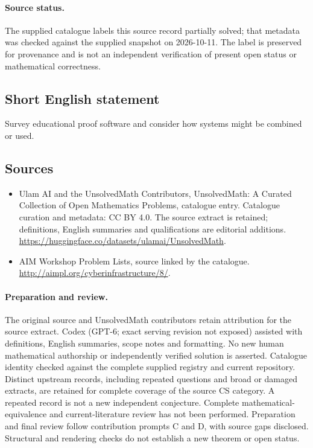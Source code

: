 \documentclass[11pt]{article}
\begin{document}
\paragraph{Source status.}
The supplied catalogue labels this source record partially solved; that metadata was checked against the supplied snapshot on 2026-10-11. The label is preserved for provenance and is not an independent verification of present open status or mathematical correctness.
\subsection{Short English statement}
Survey educational proof software and consider how systems might be combined or used.
\subsection{Sources}
\begin{itemize}
\item[\hypertarget{source:statement:1}{S1}] Ulam AI and the UnsolvedMath Contributors, UnsolvedMath: A Curated Collection of Open Mathematics Problems, catalogue entry. Catalogue curation and metadata: CC BY 4.0. The source extract is retained; definitions, English summaries and qualifications are editorial additions.
\url{https://huggingface.co/datasets/ulamai/UnsolvedMath}.
\item[\hypertarget{source:statement:2}{S2}] AIM Workshop Problem Lists, source linked by the catalogue.
\url{http://aimpl.org/cyberinfrastructure/8/}.
\end{itemize}
\paragraph{Preparation and review.}
The original source and UnsolvedMath contributors retain attribution for the source extract. Codex (GPT-6; exact serving revision not exposed) assisted with definitions, English summaries, scope notes and formatting. No new human mathematical authorship or independently verified solution is asserted. Catalogue identity checked against the complete supplied registry and current repository. Distinct upstream records, including repeated questions and broad or damaged extracts, are retained for complete coverage of the source CS category. A repeated record is not a new independent conjecture. Complete mathematical-equivalence and current-literature review has not been performed. Preparation and final review follow contribution prompts C and D, with source gaps disclosed. Structural and rendering checks do not establish a new theorem or open status.
\label{end:statement}
\end{document}
